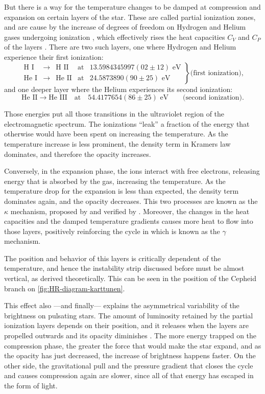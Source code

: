 	But there is a way for the temperature changes to be damped at compression and expansion on certain layers of the star. 
	These are called partial ionization zones, and are cause by the increase of degrees of freedom on Hydrogen and Helium gases undergoing ionization \citep{Cox1963},
	which effectively rises the heat capacities $C_V$ and $C_P$ of the layers \citep{Carroll2017}.
	There are two such layers, one where Hydrogen and Helium experience their first ionization:
	$$
		\left.\begin{matrix}
			\text{H I} &\to &\text{H II} & \text{at} & 13.5984345997(02\pm12) \text{ eV} \\
			\text{He I} &\to &\text{He II} & \text{at} &  24.5873890(90\pm25) \text{ eV}
		\end{matrix}\right\} \text{(first ionization)},
	$$
	and one deeper layer where the Helium experiences its second ionization:
	$$
		\text{He II} \to \text{He III}\quad \text{at}\quad 54.4177654(86\pm25) \text{ eV} \qquad \text{(second ionization)}.
	$$
	
	Those energies \citep{NIST_ASD} put all those transitions in the ultraviolet region of the electromagnetic spectrum.
	The ionizations \enquote{leak} a fraction of the energy that otherwise would have been spent on increasing the temperature.
	As the temperature increase is less prominent, the density term in Kramers law dominates, and therefore the opacity increases.
	
	Conversely, in the expansion phase, the ions interact with free electrons, releasing energy that is absorbed by the gas, increasing the temperature.
	As the temperature drop for the expansion is less than expected, the density term dominates again, and the opacity decreases. 
	This two processes are known as the $\kappa$ mechanism, proposed by \cite{Zhevakin1963} and verified by \cite{Cox1963}.
	Moreover, the changes in the heat capacities and the damped temperature gradients causes more heat to flow into those layers,
	positively reinforcing the cycle in which is known as the $\gamma$ mechanism.
	
	The position and behavior of this layers is critically dependent of the temperature, and hence the instability strip discussed before must be almost vertical,
	as \cite{Cox1963} derived theoretically. This can be seen in the position of the Cepheid branch on \autoref{fig:HR-diagram-karttunen}.

	This effect also ---and finally--- explains the asymmetrical variability of the brightness on pulsating stars.
	The amount of luminosity retained by the partial ionization layers depends on their position,
	and it releases when the layers are propelled outwards and its opacity diminishes \citep{Carroll2017}.
	The more energy trapped on the compression phase, the greater the force that would make the star expand,
	and as the opacity has just decreased, the increase of brightness happens faster.
	On the other side, the gravitational pull and the pressure gradient that closes the cycle and causes compression again
	are slower, since all of that energy has escaped in the form of light. 
	
